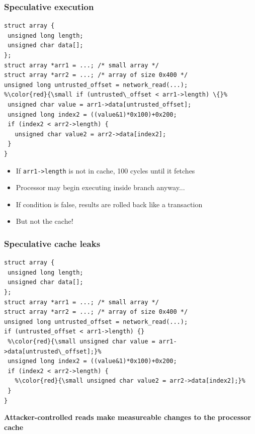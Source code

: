 \documentclass[10pt]{beamer}
\begin{document}
\begin{frame}[fragile]

\frametitle{Speculative execution}

\begin{lstlisting}[basicstyle=\small,style=customjava]
struct array {
 unsigned long length;
 unsigned char data[];
};
struct array *arr1 = ...; /* small array */
struct array *arr2 = ...; /* array of size 0x400 */
unsigned long untrusted_offset = network_read(...);
%\color{red}{\small if (untrusted\_offset < arr1->length) \{}%
 unsigned char value = arr1->data[untrusted_offset];
 unsigned long index2 = ((value&1)*0x100)+0x200;
 if (index2 < arr2->length) {
   unsigned char value2 = arr2->data[index2];
 }
}
\end{lstlisting}

\begin{itemize}
\item If \texttt{arr1->length} is not in cache, 100 cycles until it fetches
\pause

\item Processor may begin executing inside branch anyway...
\pause

\item If condition is false, results are rolled back like a transaction
\pause

\item But not the cache!

\end{itemize}

\end{frame}


\begin{frame}[fragile]

\frametitle{Speculative cache leaks}

\begin{lstlisting}[basicstyle=\small,style=customjava]
struct array {
 unsigned long length;
 unsigned char data[];
};
struct array *arr1 = ...; /* small array */
struct array *arr2 = ...; /* array of size 0x400 */
unsigned long untrusted_offset = network_read(...);
if (untrusted_offset < arr1->length) {}
 %\color{red}{\small unsigned char value = arr1->data[untrusted\_offset];}%
 unsigned long index2 = ((value&1)*0x100)+0x200;
 if (index2 < arr2->length) {
   %\color{red}{\small unsigned char value2 = arr2->data[index2];}%
 }
}
\end{lstlisting}

\begin{center}
\textbf{Attacker-controlled reads make measureable changes to the processor cache}
\end{center}

\end{frame}
\end{document}
